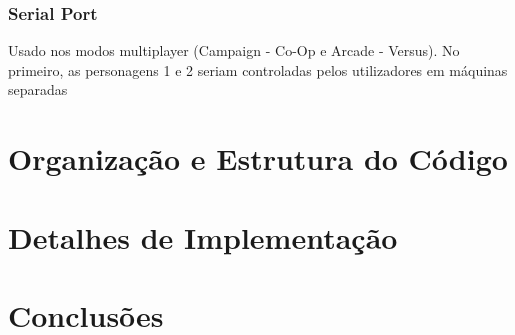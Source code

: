 \documentclass{report}
\begin{document}
\subsection{Serial Port}

Usado nos modos multiplayer (Campaign - Co-Op e Arcade - Versus). No primeiro, as personagens 1 e 2 seriam controladas pelos utilizadores em máquinas separadas 

\chapter{Organização e Estrutura do Código}

\chapter{Detalhes de Implementação}

\chapter{Conclusões}
\end{document}
